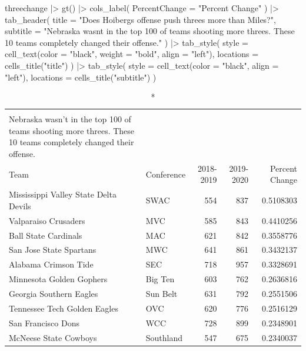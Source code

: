 \documentclass[
  letterpaper,
  DIV=11,
  numbers=noendperiod]{scrreprt}
\newenvironment{Shaded}{\begin{snugshade}}{\end{snugshade}}
\newcommand{\AttributeTok}[1]{\textcolor[rgb]{0.40,0.45,0.13}{#1}}
\newcommand{\FunctionTok}[1]{\textcolor[rgb]{0.28,0.35,0.67}{#1}}
\newcommand{\NormalTok}[1]{\textcolor[rgb]{0.00,0.23,0.31}{#1}}
\newcommand{\SpecialCharTok}[1]{\textcolor[rgb]{0.37,0.37,0.37}{#1}}
\newcommand{\StringTok}[1]{\textcolor[rgb]{0.13,0.47,0.30}{#1}}
\begin{document}
\begin{Shaded}
\begin{Highlighting}[]
\NormalTok{threechange }\SpecialCharTok{|\textgreater{}} 
  \FunctionTok{gt}\NormalTok{() }\SpecialCharTok{|\textgreater{}} 
  \FunctionTok{cols\_label}\NormalTok{(}
    \AttributeTok{PercentChange =} \StringTok{"Percent Change"}
\NormalTok{  ) }\SpecialCharTok{|\textgreater{}}
  \FunctionTok{tab\_header}\NormalTok{(}
    \AttributeTok{title =} \StringTok{"Does Hoiberg\textquotesingle{}s offense push threes more than Miles?"}\NormalTok{,}
    \AttributeTok{subtitle =} \StringTok{"Nebraska wasn\textquotesingle{}t in the top 100 of teams shooting more threes. These 10 teams completely changed their offense."}
\NormalTok{  ) }\SpecialCharTok{|\textgreater{}} \FunctionTok{tab\_style}\NormalTok{(}
    \AttributeTok{style =} \FunctionTok{cell\_text}\NormalTok{(}\AttributeTok{color =} \StringTok{"black"}\NormalTok{, }\AttributeTok{weight =} \StringTok{"bold"}\NormalTok{, }\AttributeTok{align =} \StringTok{"left"}\NormalTok{),}
    \AttributeTok{locations =} \FunctionTok{cells\_title}\NormalTok{(}\StringTok{"title"}\NormalTok{)}
\NormalTok{  ) }\SpecialCharTok{|\textgreater{}} \FunctionTok{tab\_style}\NormalTok{(}
    \AttributeTok{style =} \FunctionTok{cell\_text}\NormalTok{(}\AttributeTok{color =} \StringTok{"black"}\NormalTok{, }\AttributeTok{align =} \StringTok{"left"}\NormalTok{),}
    \AttributeTok{locations =} \FunctionTok{cells\_title}\NormalTok{(}\StringTok{"subtitle"}\NormalTok{)}
\NormalTok{  )}
\end{Highlighting}
\end{Shaded}

\begin{longtable}{llrrr}
\caption*{
{\large Does Hoiberg's offense push threes more than Miles?} \\ 
{\small Nebraska wasn't in the top 100 of teams shooting more threes. These 10 teams completely changed their offense.}
} \\ 
\toprule
Team & Conference & 2018-2019 & 2019-2020 & Percent Change \\ 
\midrule\addlinespace[2.5pt]
Mississippi Valley State Delta Devils & SWAC & 554 & 837 & 0.5108303 \\ 
Valparaiso Crusaders & MVC & 585 & 843 & 0.4410256 \\ 
Ball State Cardinals & MAC & 621 & 842 & 0.3558776 \\ 
San Jose State Spartans & MWC & 641 & 861 & 0.3432137 \\ 
Alabama Crimson Tide & SEC & 718 & 957 & 0.3328691 \\ 
Minnesota Golden Gophers & Big Ten & 603 & 762 & 0.2636816 \\ 
Georgia Southern Eagles & Sun Belt & 631 & 792 & 0.2551506 \\ 
Tennessee Tech Golden Eagles & OVC & 620 & 776 & 0.2516129 \\ 
San Francisco Dons & WCC & 728 & 899 & 0.2348901 \\ 
McNeese State Cowboys & Southland & 547 & 675 & 0.2340037 \\ 
\bottomrule
\end{longtable}
\end{document}
